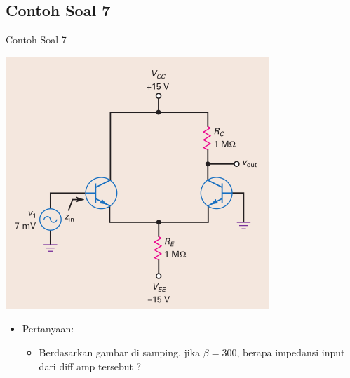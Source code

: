 \documentclass[aspectratio=169]{beamer}
\begin{document}
\subsection{Contoh Soal 7}
\begin{frame}{Contoh Soal 7}
	\begin{multicols}{2}
		\begin{center}
			\includegraphics[height=0.7\textheight]{gambar/01.diff-amp/01.contoh_soal_07}
		\end{center}
		\columnbreak
		\begin{itemize}
			\item Pertanyaan:
			\begin{itemize}
				\item Berdasarkan gambar di samping, jika $ \beta = 300 $, berapa impedansi input dari diff amp tersebut ?
			\end{itemize}
		\end{itemize}
	\end{multicols}
\end{frame}
\end{document}

